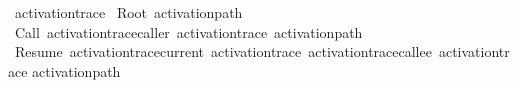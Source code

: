 \begin{isabelle}
\ activation\isacharunderscore{}trace\ \isacharequal{}\isanewline
\isaindent{\ \ \ \ }Root\ activation\isacharunderscore{}path\isanewline
\isaindent{\ \ }\isacharbar{}\ Call\ \isacharparenleft{}activation\isacharunderscore{}trace\isacharunderscore{}caller\isacharcolon{}\ activation\isacharunderscore{}trace\isacharparenright{}\ activation\isacharunderscore{}path\isanewline
\isaindent{\ \ }\isacharbar{}\ Resume\ \isacharparenleft{}activation\isacharunderscore{}trace\isacharunderscore{}current\isacharcolon{}\ activation\isacharunderscore{}trace\isacharparenright{}\ \isacharparenleft{}activation\isacharunderscore{}trace\isacharunderscore{}callee\isacharcolon{}\ activation\isacharunderscore{}trace\isacharparenright{}\isanewline
\isaindent{\ \ \ \ }activation\isacharunderscore{}path
\end{isabelle}
